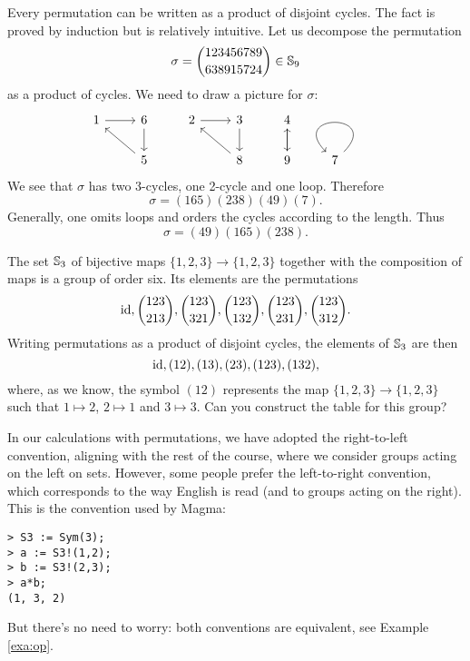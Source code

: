 Every permutation can be written as a product of disjoint cycles. The fact 
is proved by induction but is relatively intuitive. Let us 
decompose the permutation 
\[
\sigma=\binom{123456789}{638915724}\in\mathbb{S}_{9}
\]
as a product of cycles. We need to 
draw a picture for $\sigma$:
\[\begin{tikzcd}
	1 & 6 & 2 & 3 & 4 & \\
	& 5 && 8 & 9 & 7\arrow[loop]        
	\arrow[from=1-1, to=1-2]
	\arrow[from=1-2, to=2-2]
	\arrow[from=2-2, to=1-1]
	\arrow[from=1-3, to=1-4]
	\arrow[from=1-4, to=2-4]
	\arrow[from=2-4, to=1-3]
	\arrow[from=1-5, to=2-5]
	\arrow[from=2-5, to=1-5]
\end{tikzcd}\]
We see that $\sigma$ has two 3-cycles, one 2-cycle
and one loop. 
Therefore 
\[
\sigma=(165)(238)(49)(7).
\]
Generally, 
one omits loops and orders  
the cycles according to 
the length. Thus 
\[
\sigma=(49)(165)(238).
\]

\begin{example}
\label{exa:S3}
The set $\mathbb{S}_3$ of bijective maps $\{1,2,3\}\to\{1,2,3\}$
together with the composition of maps is a group of order six. 
Its elements are the permutations 
        \[
        \operatorname{id},\binom{123}{213},\binom{123}{321},\binom{123}{132},\binom{123}{231},
\binom{123}{312}.
        \]
        Writing 
        permutations as a product of disjoint cycles,  
        the elements of $\mathbb{S}_3$ 
        are then         
        \[
                \operatorname{id},(12),(13),(23),(123),(132),
        \]
        where, as we know, the symbol $(12)$ represents 
        the map $\{1,2,3\}\to\{1,2,3\}$ such that 
        $1\mapsto 2$, $2\mapsto 1$ and $3\mapsto 3$. 
        Can you construct the table for this group? 
\end{example}

\label{convention:left-to-right}
In our calculations with permutations, we have adopted the right-to-left convention, aligning with the rest of the course, where we consider groups acting on the left on sets. However, some people prefer the left-to-right convention, which corresponds to the way English is read (and to groups acting on the right). This is the convention used by Magma:
\begin{lstlisting}
> S3 := Sym(3);
> a := S3!(1,2);
> b := S3!(2,3);
> a*b;
(1, 3, 2)
\end{lstlisting}
But there's no need to worry: both conventions are equivalent, see Example \ref{exa:op}. 

